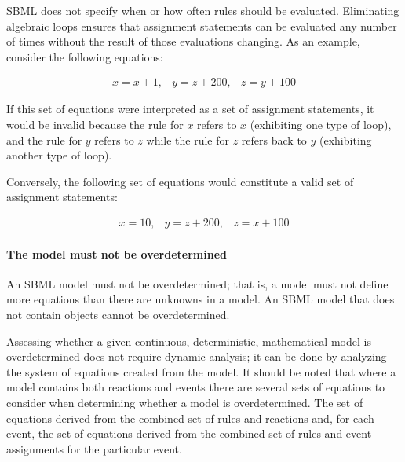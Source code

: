 SBML does not specify when or how often rules should be evaluated.
Eliminating algebraic loops ensures that assignment statements can
be evaluated any number of times without the result of those
evaluations changing.  As an example, consider the following
equations:
\begin{linenomath}
\begin{equation*}
  \begin{array}{lll}
    x = x + 1, & y = z + 200, & z = y + 100
  \end{array}
\end{equation*}
\end{linenomath}
If this set of equations were interpreted as a set of assignment
statements, it would be invalid because the rule for $x$ refers to
$x$ (exhibiting one type of loop), and the rule for $y$ refers to
$z$ while the rule for $z$ refers back to $y$ (exhibiting another
type of loop).

Conversely, the following set of equations would constitute a
valid set of assignment statements:
\begin{linenomath}
\begin{equation*}
  \begin{array}{lll}
    x = 10, & y = z + 200, & z = x + 100
  \end{array}
\end{equation*}
\end{linenomath}


\paragraph{The model must not be overdetermined}

An SBML model must not be overdetermined; that is, a model must
not define more equations than there are unknowns in a model.  An
SBML model that does not contain \AlgebraicRule objects cannot
be overdetermined.

Assessing whether a given continuous, deterministic, mathematical
model is overdetermined does not require dynamic analysis; it can
be done by analyzing the system of equations created from the
model.  It should be noted that where a model contains both
reactions and events there are several sets of equations to
consider when determining whether a model is overdetermined.  The
set of equations derived from the combined set of rules and 
reactions and, for each event, the set of equations derived from
the combined set of rules and event assignments for the particular
event. 

